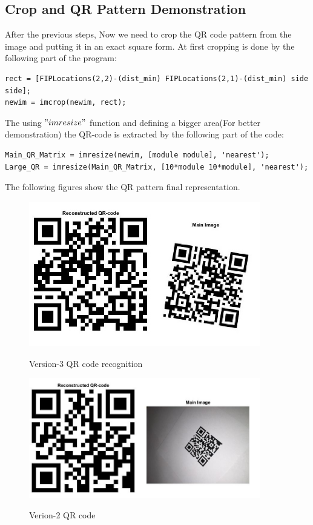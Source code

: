 \subsection{Crop and QR Pattern Demonstration}

After the previous steps, Now we need to crop the QR code pattern from the image and putting it in an exact square form. At first cropping is done by the following part of the program:

\begin{lstlisting}
rect = [FIPLocations(2,2)-(dist_min) FIPLocations(2,1)-(dist_min) side side];
newim = imcrop(newim, rect);
\end{lstlisting}

The using $"imresize"$ function and defining a bigger area(For better demonstration) the QR-code is extracted by the following part of the code:

\begin{lstlisting}
Main_QR_Matrix = imresize(newim, [module module], 'nearest');
Large_QR = imresize(Main_QR_Matrix, [10*module 10*module], 'nearest');
\end{lstlisting}

The following figures show the QR pattern final representation.

\begin{figure}[H]
  \caption{Version-3 QR code recognition}
  \centering
    \includegraphics[width=0.9\textwidth]{figures/QR1.jpg}
    \label{fig:3.8}
\end{figure}

\begin{figure}[H]
  \caption{Verion-2 QR code}
  \centering
    \includegraphics[width=0.9\textwidth]{figures/QR2.jpg}
    \label{fig:3.9}
\end{figure}


